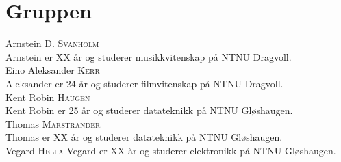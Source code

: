 \chapter{Gruppen}

Arnstein D. \textsc{Svanholm} \\
Arnstein er XX år og studerer musikkvitenskap på NTNU Dragvoll.
\\Eino Aleksander \textsc{Kerr} \\
Aleksander er 24 år og studerer filmvitenskap på NTNU Dragvoll.
\\Kent Robin \textsc{Haugen} \\
Kent Robin er 25 år og studerer datateknikk på NTNU Gløshaugen.
\\Thomas \textsc{Marstrander} \\
Thomas er XX år og studerer datateknikk på NTNU Gløshaugen.
\\Vegard \textsc{Hella}
Vegard er XX år og studerer elektronikk på NTNU Gløshaugen.
